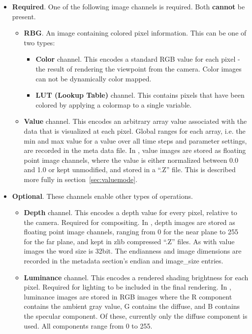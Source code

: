 \begin{itemize}
\item \textbf{Required}. One of the following image channels is required. Both \textbf{cannot} be present.
\begin{itemize}
\item \textbf{RBG}. An image containing colored pixel information. This can be one of two types:
\begin{itemize}
\item \textbf{Color} channel. This encodes a standard RGB value for each pixel - the result of rendering the viewpoint from the camera. 
Color images can not be dynamically color mapped.
\item \textbf{LUT (Lookup Table)} channel. This contains pixels that have been colored by applying a colormap to a single variable.
\end{itemize}
\item \textbf{Value} channel. This encodes an arbitrary array value associated with the data that is visualized at each pixel. Global ranges for each array, i.e. the min and max value for a value over all time steps and parameter settings, are recorded in the meta data file. In \chaplin, value images are stored as floating point image channels, where the value is either normalized between 0.0 and 1.0 or kept unmodified, and stored in a ``.Z'' file. This is described more fully in section~\ref{sec:valuemode}.
\end{itemize}
\item \textbf{Optional}. These channels enable other types of operations.
\begin{itemize}
\item \textbf{Depth} channel. This encodes a depth value for every pixel, relative to the camera. Required for compositing. In \chaplin, depth images are stored as floating point image channels, ranging from 0 for the near plane to 255 for the far plane, and kept in zlib compressed ``.Z'' files. As with value images the word size is 32bit. The endianness and image dimensions are recorded in the metadata section's endian and image\_size entries.
\item \textbf{Luminance} channel. This encodes a rendered shading brightness for each pixel. Required for lighting to be included in the final rendering. In \chaplin, luminance images are stored in RGB images where the R component contains the ambient gray value, G contains the diffuse, and B contains the specular component. Of these, currently only the diffuse component is used. All components range from 0 to 255.
\end{itemize}
\end{itemize}

